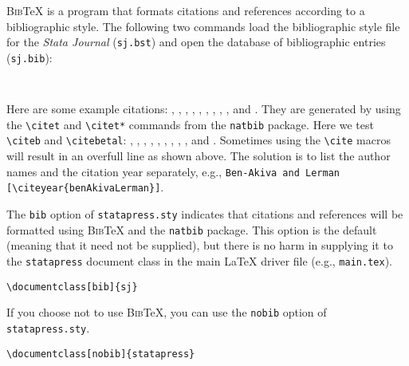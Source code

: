 \textsc{Bib}{\TeX} is a program that formats citations and references
according to a bibliographic style.  The following two commands load the
bibliographic style file for the {\sl Stata Journal\/} (\texttt{sj.bst}) and
open the database of bibliographic entries (\texttt{sj.bib}):

\begin{stverbatim}
\begin{verbatim}


\end{verbatim}
\end{stverbatim}

Here are some example citations:
%
\citet{akaike}, \citet*{benAkivaLerman}, \citet{dykePatterson},
\citet{greene03},
\citet*{kendallstuart}, \citet{hilbe93a}, \citet{hilbe94}, \citet{hilbe93b},
\citet{maddala83}, and \citet*{latexcompanion}.
%
They are generated by using
the \verb+\citet+ and \verb+\citet*+ commands from the \texttt{natbib}
package.  Here we test \verb+\citeb+ and \verb+\citebetal+:
%
, , ,
, , , ,
, , and .
Sometimes using the \verb+\cite+ macros will result in an overfull line as
shown above.  The solution is to list the author names and the citation year
separately, e.g., \verb+Ben-Akiva and Lerman [\citeyear{benAkivaLerman}]+.

\clearpage
The \texttt{bib} option of \texttt{statapress.sty} indicates that citations
and references will be formatted using \textsc{Bib}{\TeX} and the
\texttt{natbib} package.  This option is the default (meaning that it need not
be supplied), but there is no harm in supplying it to the \texttt{statapress}
document class in the main {\LaTeX} driver file (e.g., \texttt{main.tex}).

\begin{stverbatim}
\begin{verbatim}
\documentclass[bib]{sj}
\end{verbatim}
\end{stverbatim}

\noindent
If you choose not to use \textsc{Bib}{\TeX}, you can use the \texttt{nobib}
option of \texttt{statapress.sty}.

\begin{stverbatim}
\begin{verbatim}
\documentclass[nobib]{statapress}
\end{verbatim}
\end{stverbatim}

